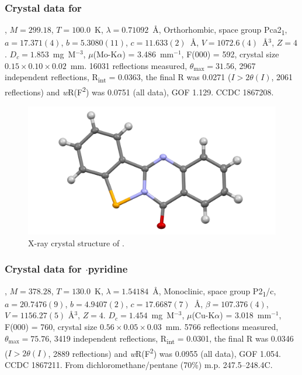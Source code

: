 \begin{refsection}
    \subsubsection{Crystal data for \texorpdfstring{}{C14H8N2OSe}}
    , $M=299.18$, $T=100.0$~K, $\lambda=0.71092$~\AA, Orthorhombic, space group Pca2\textsubscript{1}, $a = 17.371(4)$, $b = 5.3080(11)$, $c = 11.633(2)$~\AA, $V = 1072.6(4)$~\AA$^{3}$, $Z = 4$.
    $D_{c}= 1.853$~mg~M$^{-3}$, $\mu$(Mo-K$\alpha$) = 3.486~mm$^{-1}$, F(000) = 592, crystal size $0.15 \times 0.10 \times 0.02$~mm.
    16031 reflections measured, $\theta_{\max}=31.56$\degree, 2967 independent reflections, R\textsubscript{int} = 0.0363, the final R was 0.0271 ($I > 2\theta(I)$, 2061 reflections) and \textit{w}R(F\textsuperscript{2}) was 0.0751 (all data), GOF 1.129.
    CCDC 1867208.
    
    \begin{figure}
      \includegraphics[width=0.6\linewidth]{Figures/tetracycle-xtal.pdf}
      \caption{X-ray crystal structure of \texorpdfstring{}{C14H8N2OSe}.}
    \end{figure}
    
    \subsubsection{Crystal data for \texorpdfstring{$ \cdot $pyridine}{C19H13N3OSe}}
    , $M=378.28$, $T=130.0$~K, $\lambda=1.54184$~\AA, Monoclinic, space group P2\textsubscript{1}/c, $a = 20.7476(9)$, $b = 4.9407(2)$, $c = 17.6687(7)$~\AA, $\beta = 107.376(4)$\degree, $V = 1156.27(5)$ \AA$^{3}$, $Z = 4$.
    $D_{c} = 1.454$~mg~M$^{-3}$, $\mu$(Cu-K$\alpha$) = 3.018~mm$^{-1}$, F(000) = 760, crystal size $0.56 \times 0.05 \times 0.03$~mm.
    5766 reflections measured, $\theta_{\max} = 75.76$\degree, 3419 independent reflections, R\textsubscript{int} = 0.0301, the final R was 0.0346 ($I > 2\theta(I)$, 2889 reflections) and \textit{w}R(F\textsuperscript{2}) was 0.0955 (all data), GOF 1.054.
    CCDC 1867211.
    From dichloromethane/pentane (70\%) m.p. 247.5--248.4\degree{}C.
    

\end{refsection}
